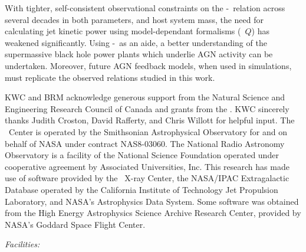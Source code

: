 \documentclass{emulateapj}
\begin{document}
With tighter, self-consistent observational constraints on the
\pjet-\prad\ relation across several decades in both parameters, and
host system mass, the need for calculating jet kinetic power using
model-dependant formalisms (\ie\ $Q$) has weakened
significantly. Using \pjet-\prad\ as an aide, a better understanding
of the supermassive black hole power plants which underlie AGN
activity can be undertaken. Moreover, future AGN feedback models, when
used in simulations, must replicate the observed relations studied in
this work.

\acknowledgements

KWC and BRM acknowledge generous support from the Natural Science and
Engineering Research Council of Canada and grants from the \cxo. KWC
sincerely thanks Judith Croston, David Rafferty, and Chris Willott for
helpful input. The \cxo\ Center is operated by the Smithsonian
Astrophysical Observatory for and on behalf of NASA under contract
NAS8-03060. The National Radio Astronomy Observatory is a facility of
the National Science Foundation operated under cooperative agreement
by Associated Universities, Inc. This research has made use of
software provided by the \chandra\ X-ray Center, the NASA/IPAC
Extragalactic Database operated by the California Institute of
Technology Jet Propulsion Laboratory, and NASA's Astrophysics Data
System. Some software was obtained from the High Energy Astrophysics
Science Archive Research Center, provided by NASA's Goddard Space
Flight Center.


{\it Facilities:}  





\clearpage



\end{document}
